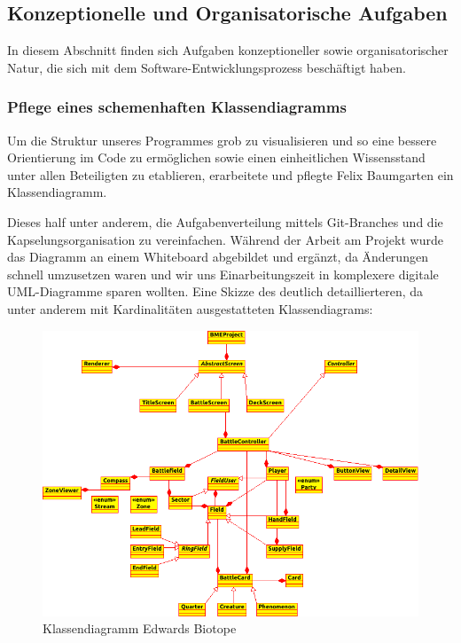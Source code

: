\subsection{Konzeptionelle und Organisatorische Aufgaben}
In diesem Abschnitt finden sich Aufgaben konzeptioneller sowie organisatorischer Natur, die sich mit dem Software-Entwicklungsprozess beschäftigt haben.

\subsubsection{Pflege eines schemenhaften Klassendiagramms}
Um die Struktur unseres Programmes grob zu visualisieren und so eine bessere Orientierung im Code zu ermöglichen sowie einen einheitlichen Wissensstand unter allen Beteiligten zu etablieren, erarbeitete und pflegte Felix Baumgarten ein Klassendiagramm.

Dieses half unter anderem, die Aufgabenverteilung mittels Git-Branches und die Kapselungsorganisation zu vereinfachen. Während der Arbeit am Projekt wurde das Diagramm an einem Whiteboard abgebildet und ergänzt, da Änderungen schnell umzusetzen waren und wir uns Einarbeitungszeit in komplexere digitale UML-Diagramme sparen wollten.
Eine Skizze des deutlich detaillierteren, da unter anderem mit Kardinalitäten ausgestatteten Klassendiagrams:

\begin{figure}[h]
\includegraphics[width=1\textwidth]{../img/klassendiagramm.PNG}
\caption{Klassendiagramm Edwards Biotope}
\label{fig:Klassendiagramm_Edwards_Biotope}
\end{figure}

